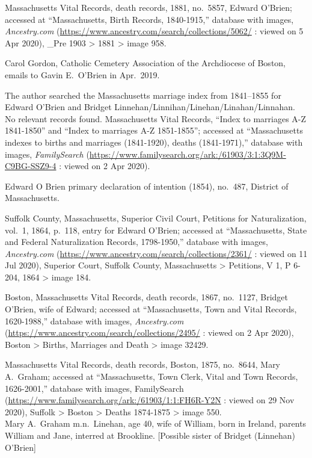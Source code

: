\begin{thebibliography}{999}
Massachusetts Vital Records, death records, 1881, no.\ 5857, Edward O'Brien; accessed at ``Massachusetts, Birth Records, 1840-1915,'' database with images, \textit{Ancestry.com} (\url{https://www.ancestry.com/search/collections/5062/} : viewed on 5 Apr 2020), \_Pre 1903 > 1881 > image 958.

Carol Gordon, Catholic Cemetery Association of the Archdiocese of Boston, emails to Gavin E.\ O'Brien in Apr.\ 2019.

The author searched the Massachusetts marriage index from 1841--1855 for Edward O'Brien and Bridget Linnehan/Linnihan/Linehan/Linahan/Linnahan. No relevant records found.	
Massachusetts Vital Records, ``Index to marriages A-Z 1841-1850'' and ``Index to marriages A-Z 1851-1855''; accessed at ``Massachusetts indexes to births and marriages (1841-1920), deaths (1841-1971),'' database with images, \textit{FamilySearch} (\url{https://www.familysearch.org/ark:/61903/3:1:3Q9M-C9BG-SSZ9-4} : viewed on 2 Apr 2020).

Edward O Brien primary declaration of intention (1854), no.\ 487, District of Massachusetts.

Suffolk County, Massachusetts, Superior Civil Court, Petitions for Naturalization, vol.\ 1, 1864, p.\ 118, entry for Edward O'Brien; accessed at ``Massachusetts, State and Federal Naturalization Records, 1798-1950,'' database with images, \textit{Ancestry.com} (\url{https://www.ancestry.com/search/collections/2361/} : viewed on 11 Jul 2020), Superior Court, Suffolk County, Massachusetts > Petitions, V 1, P 6-204, 1864 > image 184.

Boston, Massachusetts Vital Records, death records, 1867, no.\ 1127, Bridget O'Brien, wife of Edward; accessed at ``Massachusetts, Town and Vital Records, 1620-1988,'' database with images, \textit{Ancestry.com} (\url{https://www.ancestry.com/search/collections/2495/} : viewed on 2 Apr 2020), Boston > Births, Marriages and Death > image 32429.

Massachusetts Vital Records, death records, Boston, 1875, no.\ 8644, Mary A.\ Graham; accessed at ``Massachusetts, Town Clerk, Vital and Town Records, 1626-2001,'' database with images, FamilySearch (\url{https://www.familysearch.org/ark:/61903/1:1:FH6R-Y2N} : viewed on 29 Nov 2020), Suffolk > Boston > Deaths 1874-1875 > image 550.\\
Mary A.\ Graham m.n.\ Linehan, age 40, wife of William, born in Ireland, parents William and Jane, interred at Brookline. [Possible sister of Bridget (Linnehan) O'Brien]


\end{thebibliography}
